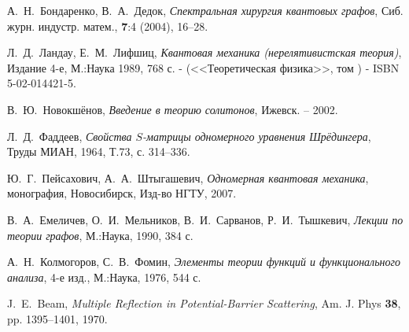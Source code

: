 \documentclass[a4 paper, 12 pt]{extarticle}
\newcommand{\RomanNumeralCaps}[1]
{\MakeUppercase{\romannumeral #1}}
\begin{document}
\begin{thebibliography}{1}
	 А.~Н.~Бондаренко, В.~А.~Дедок, {\it Спектральная хирургия квантовых графов}, Сиб. журн. индустр. матем., \textbf{7}:4 (2004), 16--28.
	
	 Л.~Д.~Ландау, Е.~М.~Лифшиц, {\it Квантовая механика (нерелятивистская теория)}, Издание 4-е, М.:Наука 1989, 768 с. - (<<Теоретическая физика>>, том \RomanNumeralCaps{3}) - ISBN 5-02-014421-5.
	
	 В.~Ю.~Новокшёнов, {\it Введение в теорию солитонов}, Ижевск. – 2002.
	
	 Л.~Д.~Фаддеев, {\it Свойства $S$-матрицы одномерного уравнения Шрёдингера}, Труды МИАН, 1964, Т.73, с. 314--336.
	
	 Ю.~Г.~Пейсахович, А.~А.~Штыгашевич, {\it Одномерная квантовая механика}, монография, Новосибирск, Изд-во НГТУ, 2007.
	
	 В.~А.~Емеличев, О.~И.~Мельников, В.~И.~Сарванов, Р.~И.~Тышкевич, {\it Лекции по теории графов}, М.:Наука, 1990, 384 с.
	

	
	 А.~Н.~Колмогоров, С.~В.~Фомин, {\it Элементы теории функций и функционального анализа}, 4-е изд., М.:Наука, 1976, 544 с.
	
	 J.~E.~Beam, {\it Multiple Reflection in Potential-Barrier Scattering}, Am. J. Phys \textbf{38}, pp. 1395--1401, 1970.
	
	
	
\end{thebibliography}
\end{document}

